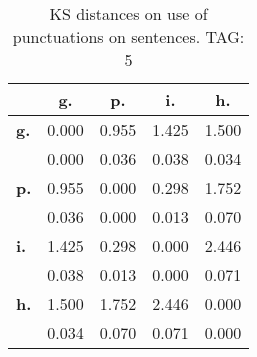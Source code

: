 \begin{table}[h!]
\begin{center}
\begin{tabular}{| l || c | c | c | c |}\hline
 & {\bf g.} & {\bf p.} & {\bf i.} & {\bf h.} \\\hline\hline
{\bf g.} & 0.000 & 0.955 & 1.425 & 1.500 \\
{\bf } & 0.000 & 0.036 & 0.038 & 0.034 \\\hline
{\bf p.} & 0.955 & 0.000 & 0.298 & 1.752 \\
{\bf } & 0.036 & 0.000 & 0.013 & 0.070 \\\hline
{\bf i.} & 1.425 & 0.298 & 0.000 & 2.446 \\
{\bf } & 0.038 & 0.013 & 0.000 & 0.071 \\\hline
{\bf h.} & 1.500 & 1.752 & 2.446 & 0.000 \\
{\bf } & 0.034 & 0.070 & 0.071 & 0.000 \\\hline
\end{tabular}
\caption{KS distances on use of punctuations on sentences. TAG: 5}
\end{center}
\end{table}